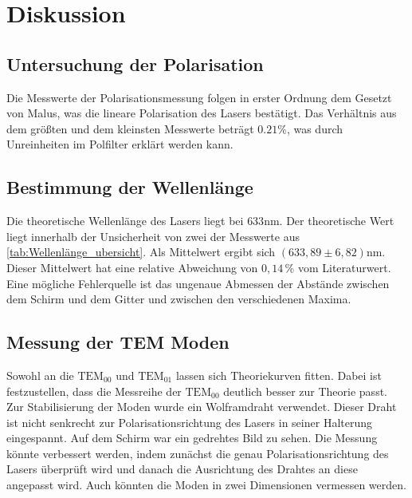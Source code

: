 \section{Diskussion}
\label{sec:Diskussion}



\subsection{Untersuchung der Polarisation}
\label{sec:Polarisation}

Die Messwerte der Polarisationsmessung folgen in erster Ordnung dem Gesetzt von Malus, was die lineare Polarisation des Lasers bestätigt.
Das Verhältnis aus dem größten und dem kleinsten Messwerte beträgt $0.21 \% $, was durch Unreinheiten im Polfilter erklärt werden kann.

\subsection{Bestimmung der Wellenlänge}
\label{sec:Wellenlänge}

Die theoretische Wellenlänge des Lasers liegt bei $633 \unit{\nano\meter}$\cite{eicheich}. Der theoretische Wert liegt innerhalb der Unsicherheit von zwei der Messwerte aus \autoref{tab:Wellenlänge_ubersicht}.
Als Mittelwert ergibt sich $ \left( 633,89 \pm 6,82 \right) \unit{\nano\meter}$. Dieser Mittelwert hat eine relative Abweichung von $ 0,14 \,\% $ vom Literaturwert.
Eine mögliche Fehlerquelle ist das ungenaue Abmessen der Abstände zwischen dem Schirm und dem Gitter und zwischen den verschiedenen Maxima. 


\subsection{Messung der TEM Moden}
\label{sec:TEM_moden}
Sowohl an die $\text{TEM}_{00}$ und $\text{TEM}_{01}$ lassen sich Theoriekurven fitten. Dabei ist festzustellen, dass die Messreihe der $\text{TEM}_{00}$ deutlich besser zur Theorie passt.
Zur Stabilisierung der Moden wurde ein Wolframdraht verwendet. Dieser Draht ist nicht senkrecht zur Polarisationsrichtung des Lasers in seiner Halterung eingespannt.
Auf dem Schirm war ein gedrehtes Bild zu sehen. Die Messung könnte verbessert werden, indem zunächst die genau Polarisationsrichtung des Lasers überprüft wird und danach die Ausrichtung des Drahtes an diese angepasst wird.    
Auch könnten die Moden in zwei Dimensionen vermessen werden.

